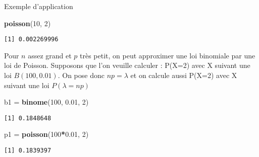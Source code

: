 \documentclass[
  ignorenonframetext,
]{beamer}
\newenvironment{Shaded}{\begin{snugshade}}{\end{snugshade}}
\newcommand{\DecValTok}[1]{\textcolor[rgb]{0.00,0.00,0.81}{#1}}
\newcommand{\FloatTok}[1]{\textcolor[rgb]{0.00,0.00,0.81}{#1}}
\newcommand{\FunctionTok}[1]{\textcolor[rgb]{0.13,0.29,0.53}{\textbf{#1}}}
\newcommand{\NormalTok}[1]{#1}
\newcommand{\OtherTok}[1]{\textcolor[rgb]{0.56,0.35,0.01}{#1}}
\newcommand{\SpecialCharTok}[1]{\textcolor[rgb]{0.81,0.36,0.00}{\textbf{#1}}}
\begin{document}
\begin{frame}[fragile]{Exemple d'application}
\protect\hypertarget{exemple-2}{}
\begin{Shaded}
\begin{Highlighting}[]
\FunctionTok{poisson}\NormalTok{(}\DecValTok{10}\NormalTok{, }\DecValTok{2}\NormalTok{)}
\end{Highlighting}
\end{Shaded}

\begin{verbatim}
[1] 0.002269996
\end{verbatim}

Pour \(n\) assez grand et \(p\) très petit, on peut approximer une loi
binomiale par une loi de Poisson. Supposons que l'on veuille calculer :
P(X=2) avec X suivant une loi \(B(100, 0.01)\). On pose donc
\(np=\lambda\) et on calcule aussi P(X=2) avec X suivant une loi
\(P(\lambda = np)\)

\begin{Shaded}
\begin{Highlighting}[]
\NormalTok{b1 }\OtherTok{=} \FunctionTok{binome}\NormalTok{(}\DecValTok{100}\NormalTok{, }\FloatTok{0.01}\NormalTok{, }\DecValTok{2}\NormalTok{)}
\end{Highlighting}
\end{Shaded}

\begin{verbatim}
[1] 0.1848648
\end{verbatim}

\begin{Shaded}
\begin{Highlighting}[]
\NormalTok{p1 }\OtherTok{=} \FunctionTok{poisson}\NormalTok{(}\DecValTok{100}\SpecialCharTok{*}\FloatTok{0.01}\NormalTok{, }\DecValTok{2}\NormalTok{)}
\end{Highlighting}
\end{Shaded}

\begin{verbatim}
[1] 0.1839397
\end{verbatim}
\end{frame}
\end{document}

